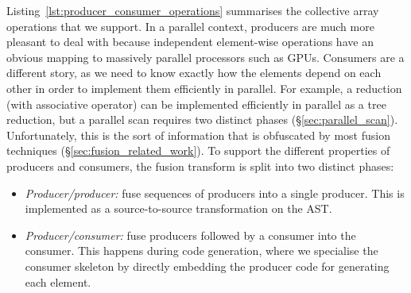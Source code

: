 Listing~\ref{lst:producer_consumer_operations} summarises the collective array operations that we
support. In a parallel context, producers are much more pleasant to deal with
because independent element-wise operations have an obvious mapping to massively
parallel processors such as GPUs. Consumers are
a different story, as we need to know exactly how the elements depend on each
other in order to implement them efficiently in parallel. For example, a
reduction (with associative operator) can be implemented efficiently in
parallel as a tree reduction, but a parallel scan requires two distinct phases
(\S\ref{sec:parallel_scan}). Unfortunately, this is the sort of
information that is obfuscated by most fusion techniques
(\S\ref{sec:fusion_related_work}). To support the different properties of
producers and consumers, the fusion transform is split into two distinct phases:
%
\begin{itemize}
    \item \emph{Producer/producer:} fuse sequences of producers into a single
        producer. This is implemented as a source-to-source transformation on
        the AST\@.

    \item \emph{Producer/consumer:} fuse producers followed by a consumer into
        the consumer. This happens during code generation, where we specialise
        the consumer skeleton by directly embedding the producer code for
        generating each element.
\end{itemize}


